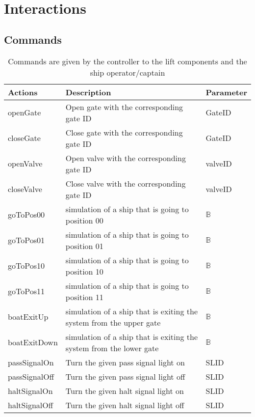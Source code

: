 \section{Interactions}
\subsection{Commands}
\begin{table}[htbp]
	\centering
	\caption{Commands are given by the controller to the lift components and the ship operator/captain}
	\begin{tabular}{lll}
		\toprule
		\textbf{Actions} & \textbf{Description} & \textbf{Parameter} \\
		\midrule
		openGate & Open gate with the corresponding gate ID & GateID \\
		closeGate & Close gate with the corresponding gate ID & GateID \\
		openValve & Open valve with the corresponding gate ID & valveID \\
		closeValve & Close valve with the corresponding gate ID & valveID \\
		goToPos00  & simulation of a ship that is going to position 00 & $ \mathbb{B} $ \\
		goToPos01  & simulation of a ship that is going to position 01 & $ \mathbb{B} $ \\
		goToPos10  & simulation of a ship that is going to position 10 & $ \mathbb{B} $ \\
		goToPos11  & simulation of a ship that is going to position 11 & $ \mathbb{B} $ \\
		boatExitUp  & simulation of a ship that is exiting the system from the upper gate & $ \mathbb{B} $ \\
		boatExitDown  & simulation of a ship that is exiting the system from the lower gate & $ \mathbb{B} $ \\
		passSignalOn & Turn the given pass signal light on & SLID\\
		passSignalOff & Turn the given pass signal light off & SLID\\
		haltSignalOn & Turn the given halt signal light on & SLID\\
		haltSignalOff & Turn the given halt signal light off & SLID\\

\bottomrule
\end{tabular}%
\label{tab:addlabel}%
\end{table}%
		
		
		



